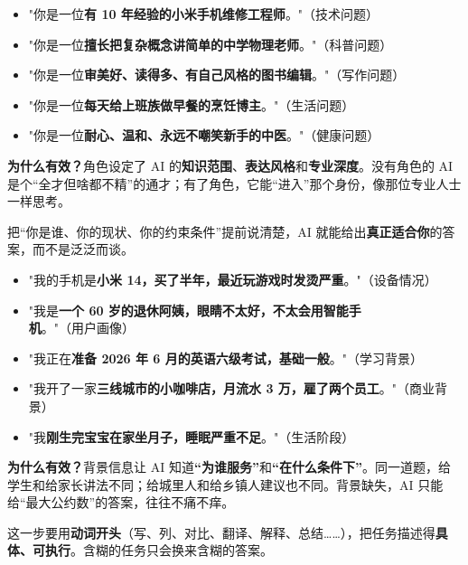 
\begin{itemize}
  \item "你是一位\textbf{有 10 年经验的小米手机维修工程师}。"（技术问题）
  \item "你是一位\textbf{擅长把复杂概念讲简单的中学物理老师}。"（科普问题）
  \item "你是一位\textbf{审美好、读得多、有自己风格的图书编辑}。"（写作问题）
  \item "你是一位\textbf{每天给上班族做早餐的烹饪博主}。"（生活问题）
  \item "你是一位\textbf{耐心、温和、永远不嘲笑新手的中医}。"（健康问题）
\end{itemize}

\textbf{为什么有效？}角色设定了 AI 的\textbf{知识范围}、\textbf{表达风格}和\textbf{专业深度}。没有角色的 AI 是个“全才但啥都不精”的通才；有了角色，它能“进入”那个身份，像那位专业人士一样思考。


把“你是谁、你的现状、你的约束条件”提前说清楚，AI 就能给出\textbf{真正适合你}的答案，而不是泛泛而谈。


\begin{itemize}
  \item "我的手机是\textbf{小米 14，买了半年，最近玩游戏时发烫严重}。"（设备情况）
  \item "我是\textbf{一个 60 岁的退休阿姨，眼睛不太好，不太会用智能手机}。"（用户画像）
  \item "我正在\textbf{准备 2026 年 6 月的英语六级考试，基础一般}。"（学习背景）
  \item "我开了一家\textbf{三线城市的小咖啡店，月流水 3 万，雇了两个员工}。"（商业背景）
  \item "我\textbf{刚生完宝宝在家坐月子，睡眠严重不足}。"（生活阶段）
\end{itemize}

\textbf{为什么有效？}背景信息让 AI 知道\textbf{“为谁服务”}和\textbf{“在什么条件下”}。同一道题，给学生和给家长讲法不同；给城里人和给乡镇人建议也不同。背景缺失，AI 只能给“最大公约数”的答案，往往不痛不痒。


这一步要用\textbf{动词开头}（写、列、对比、翻译、解释、总结……），把任务描述得\textbf{具体、可执行}。含糊的任务只会换来含糊的答案。


